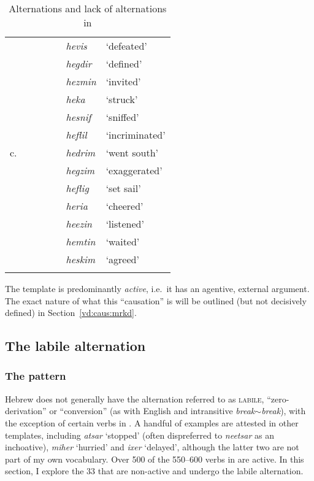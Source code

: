 \begin{exe}
\begin{xlist}
\begin{xlist}
\begin{exe}
\begin{table}
\begin{tabularx}{\textwidth}{lllllll}
	& &&&& \emph{hevis} & `defeated'\\
	& &&&& \emph{hegdir} & `defined'\\
	& &&&& \emph{hezmin} & `invited'\\
	& &&&& \emph{heka} & `struck'\\
	& &&&& \emph{hesnif} & `sniffed'\\
	& &&&& \emph{heflil} & `incriminated'\\
	\tablevspace
	c.	& &&&&  \emph{hedrim} & `went south' \\
		& &&&&  \emph{hegzim} & `exaggerated' \\
		& &&&&  \emph{heflig} & `set sail' \\
		& &&&&  \emph{heria} & `cheered' \\
		& &&&& \emph{heezin} & `listened'\\
		& &&&& \emph{hemtin} & `waited'\\
		& &&&& \emph{heskim} & `agreed'\\
\lspbottomrule
 	\end{tabularx}
	\caption{Alternations and lack of alternations in {\thif}}
	\label{table:vd:alternations-heb-long} 
\end{table}

The template is predominantly \emph{active}, i.e.~it has an agentive, external argument. The exact nature of what this ``causation'' is will be outlined (but not decisively defined) in Section~\ref{vd:caus:mrkd}.


	\subsection{The labile alternation} \label{vd:thif:inch}
		\subsubsection{The pattern}
Hebrew does not generally have the alternation referred to as \textsc{labile}, ``zero-derivation'' or ``conversion'' (as with English  and intransitive \emph{break}$\sim$\emph{break}), with the exception of certain verbs in {\thif}. A handful of examples are attested in other templates, including \emph{a{ts}ar} `stopped' (often dispreferred to \emph{nee{ts}ar} as an inchoative), \emph{miher} `hurried' and \emph{ixer} `delayed', although the latter two are not part of my own  vocabulary. Over 500 of the 550--600 verbs in {\thif} are active. In this section, I explore the 33 that are non-active and undergo the labile alternation.


\end{exe}
\end{xlist}
\end{xlist}
\end{exe}

